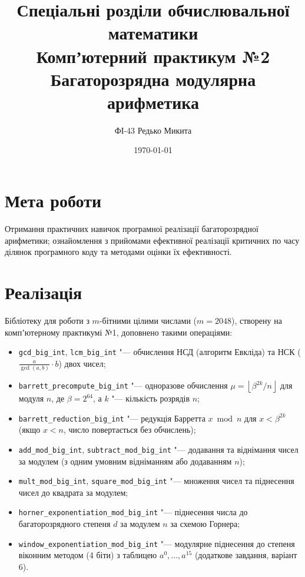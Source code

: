 \documentclass[11pt]{article}
\title{Спеціальні розділи обчислювальної математики\\
Компʼютерний практикум №2\\[1em]
Багаторозрядна модулярна арифметика}
\author{ФІ-43 Редько Микита}
\date{\today}
\newcommand{\code}[1]{\texttt{#1}}
\begin{document}

\maketitle

\section{Мета роботи}
Отримання практичних навичок програмної реалізації багаторозрядної арифметики;
ознайомлення з прийомами ефективної реалізації критичних по часу
ділянок програмного коду та методами оцінки їх ефективності.

\section{Реалізація}

Бібліотеку для роботи з $m$-бітними цілими числами ($m = 2048$), створену
на компʼютерному практикумі №1, доповнено такими операціями:
\begin{itemize}
    \item \code{gcd\_big\_int}, \code{lcm\_big\_int} "--- обчислення НСД
          (алгоритм Евкліда) та НСК ($\frac{a}{\gcd(a, b)} \cdot b$) двох чисел;
    \item \code{barrett\_precompute\_big\_int} "--- одноразове обчислення
          $\mu = \left\lfloor \beta^{2k} / n \right\rfloor$ для модуля $n$,
          де $\beta = 2^{64}$, а $k$ "--- кількість розрядів $n$;
    \item \code{barrett\_reduction\_big\_int} "--- редукція Барретта $x \bmod n$
          для $x < \beta^{2k}$ (якщо $x < n$, число повертається без обчислень);
    \item \code{add\_mod\_big\_int}, \code{subtract\_mod\_big\_int} "--- додавання
          та віднімання чисел за модулем (з одним умовним відніманням або додаванням $n$);
    \item \code{mult\_mod\_big\_int}, \code{square\_mod\_big\_int} "--- множення
          чисел та піднесення чисел до квадрата за модулем;
    \item \code{horner\_exponentiation\_mod\_big\_int} "--- піднесення числа
          до багаторозрядного степеня $d$ за модулем $n$ за схемою Горнера;
    \item \code{window\_exponentiation\_mod\_big\_int} "--- модулярне піднесення
          до степеня віконним методом (4 біти) з таблицею $a^0, \dots, a^{15}$
          (додаткове завдання, варіант 6).
\end{itemize}
\end{document}
